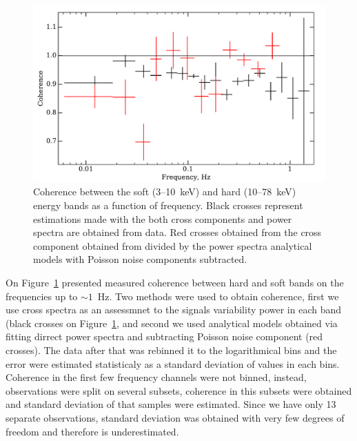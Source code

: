 \documentclass[a4paper,fleqn,usenatbib]{mnras}
\begin{document}
\begin{figure}
    \includegraphics[width=\columnwidth]{coherence_3.pdf}
    \caption{Coherence between the soft (3--10~keV) and hard (10--78~keV) energy bands as a function of frequency. 
     Black crosses  represent estimations made with the both cross components and power spectra are obtained from data.
     Red crosses obtained from the cross component obtained from divided by the power spectra analytical models with Poisson noise components subtracted.}
    \label{fig:coherence}
\end{figure}


On Figure~\ref{fig:coherence} presented measured coherence between hard and soft bands on the frequencies up to $\sim1$~Hz. 
Two methods were used to obtain coherence, first we use cross spectra as an assessmnet to the signals variability power in each band (black crosses on Figure~\ref{fig:coherence}, and second we used analytical models obtained via fitting dirrect power spectra and subtracting Poisson noise component (red crosses). 
The data after that was rebinned it to the logarithmical bins and the error were estimated statisticaly as a standard deviation of values in each bins. 
Coherence in the first few frequency channels were not binned, instead, observations were split on several subsets, coherence in this subsets were obtained and standard deviation of that samples were estimated.
Since we have only 13 separate observations, standard deviation was obtained with very few degrees of freedom and therefore is underestimated. 
\end{document}
